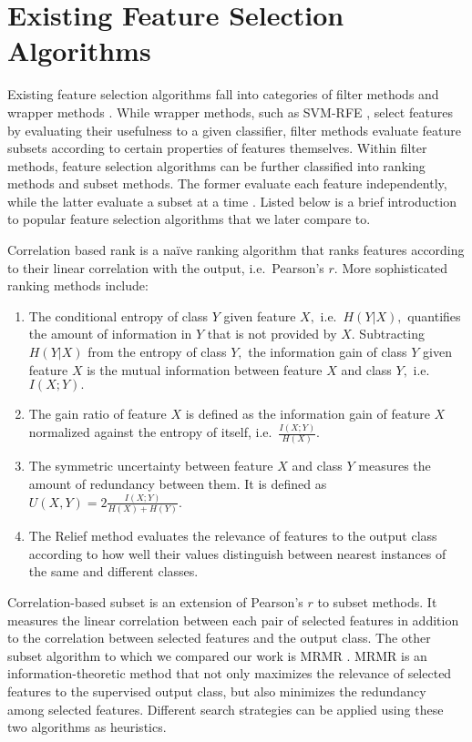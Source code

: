 \section{Existing Feature Selection Algorithms}

Existing feature selection algorithms fall into categories of filter
methods and wrapper methods \cite{guyon_jmlr03}. While
wrapper methods, such as SVM-RFE \cite{guyon2002gene}, select features
by evaluating their usefulness to a given classifier, filter methods
evaluate feature subsets according to certain properties of features 
themselves. Within filter methods, feature selection algorithms can be
further classified into ranking methods and subset methods. The former
evaluate each feature independently, while the latter evaluate a
subset at a time \cite{brown2012conditional}. Listed below is a brief
introduction to popular feature selection algorithms that we later
compare to.

Correlation based rank is a na\"{i}ve ranking algorithm that ranks
features according to their linear correlation with the output,
i.e.\ Pearson's $r.$ More sophisticated ranking methods include:
\begin{enumerate}
\item The conditional entropy of class $Y$ given feature $X,$
  i.e.\ $H\left(Y|X\right),$ quantifies the amount of information in
  $Y$ that is not provided by $X.$ Subtracting $H\left(Y|X\right)$
  from the entropy of class $Y,$ the information gain of class $Y$
  given feature $X$ is the mutual information between feature $X$ and
  class $Y,$ i.e.\ $I\left(X;Y\right).$
\item The gain ratio of feature $X$ is defined as the information gain
  of feature $X$ normalized against the entropy of itself,
  i.e.\ $\frac{I\left(X;Y\right)}{H\left(X\right)}.$
\item The symmetric uncertainty between feature $X$ and class $Y$
  measures the amount of redundancy between them. It is defined as
  $U\left(X,Y\right)=2\frac{I\left(X;Y\right)}{H\left(X\right)+H\left(Y\right)}.$
\item The Relief method \cite{kira1992feature} evaluates the relevance
  of features to the output class according to how well their values
  distinguish between nearest instances of the same and different
  classes.
\end{enumerate}

Correlation-based subset \cite{Hall1998} is an extension
of Pearson's $r$ to subset methods. It measures the linear correlation
between each pair of selected features in addition to the correlation
between selected features and the output class. The other subset
algorithm to which we compared our work is MRMR \cite{peng2005}.
MRMR is an information-theoretic method that not only maximizes
the relevance of selected features to the supervised output class,
but also minimizes the redundancy among selected features. Different
search strategies can be applied using these two algorithms as
heuristics.

